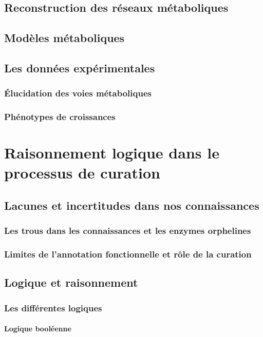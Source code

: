 \begin{refsection}
    \subsection{Reconstruction des réseaux métaboliques}
    \subsection{Modèles métaboliques}
    \subsection{Les données expérimentales}
    \subsubsection{Élucidation des voies métaboliques}
    \subsubsection{Phénotypes de croissances}
    
    \section{Raisonnement logique dans le processus de curation}
    \subsection{Lacunes et incertitudes dans nos connaissances}
    \subsubsection{Les trous dans les connaissances et les enzymes orphelines}
    \subsubsection{Limites de l’annotation fonctionnelle et rôle de la curation}
    \subsection{Logique et raisonnement}
    \subsubsection{Les différentes logiques}
    \paragraph{Logique booléenne}

\end{refsection}
